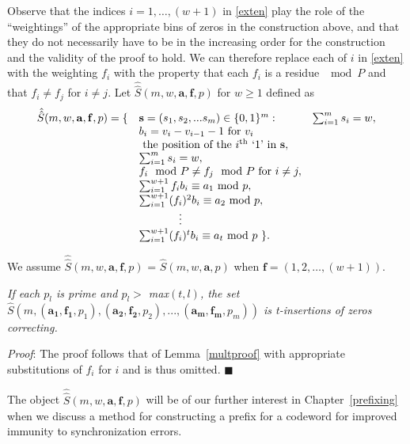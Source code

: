 Observe that the indices $i=1,\dots,(w+1)$ in \eqref{exten} play
the role of the ``weightings'' of the appropriate bins of zeros in
the construction above, and that they do not necessarily have to
be in the increasing order for the construction and the validity
of the proof to hold. We can therefore replace each of $i$ in
\eqref{exten} with the weighting $f_i$ with the property that each
$f_i$ is a residue $\mod P$ and that $f_i \neq f_j$ for $i\neq j$.
Let $\hat{\hat{S}}(m,w,\mathbf{a},\mathbf{f}, p)$  for $w \geq 1$
defined as
\begin{equation}\label{exten2}\begin{array}{lll}\hat{\hat{S}}(m,w,\mathbf{a},\mathbf{f},p) = \{ & \mathbf{s}=(s_1, s_2, ... s_m) \in \{0,1\}^m
:{} & \sum_{i=1}^m s_i = w,\\{} & b_i=v_i-v_{i-1}-1 \text{ for } v_i \\ {} &  \text{ the position of the } i^{\text{th} }\text{ `1' in } \mathbf{s},\\
{} & \sum_{i=1}^m s_i = w,\\
{} & f_i \mod P \neq f_j \mod P \text{ for } i \neq j,\\
 {} & \sum_{i=1}^{w+1} f_ib_i \equiv a_1 \text{ mod } p,\\ {} &
\sum_{i=1}^{w+1} (f_i)^2b_i
\equiv a_2 \text{ mod } p,\\
{} & \hspace{0.5in}\vdots\\ {} & \sum_{i=1}^{w+1} (f_i)^tb_i
\equiv a_t \text{ mod } p~\}.\end{array}\end{equation}

We assume $\hat{\hat{S}}(m,w,\mathbf{a},\mathbf{f}, p)$ =
$\hat{S}(m,w,\mathbf{a},p)$ when $\mathbf{f}=(1,2,\dots,(w+1))$.

\begin{lemma}\textit{If each $p_l$ is prime and $p_l >$
max$(t,l)$, the set $\hat{S}\left(m,(\mathbf{a_1},\mathbf{f_1},
p_1),(\mathbf{a_2},\mathbf{f_2},
p_2),...,(\mathbf{a_m},\mathbf{f_m}, p_m)\right)$ is t-insertions
of zeros correcting.}\end{lemma}

\textit{Proof}: The proof follows that of Lemma~\ref{multproof}
with appropriate substitutions of $f_i$ for $i$ and is thus
omitted. \hfill$\blacksquare$

The object $\hat{\hat{S}}(m,w,\mathbf{a},\mathbf{f}, p)$ will be
of our further interest in Chapter~\ref{prefixing} when we discuss
a method for constructing a prefix for a codeword for improved
immunity to synchronization errors.

